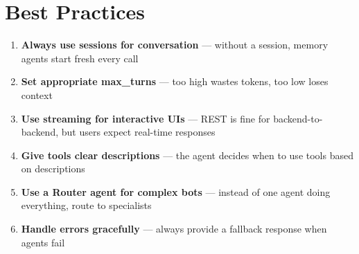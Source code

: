 \section{Best Practices}

\begin{enumerate}
    \item \textbf{Always use sessions for conversation} --- without a session, memory agents start fresh every call
    \item \textbf{Set appropriate max\_turns} --- too high wastes tokens, too low loses context
    \item \textbf{Use streaming for interactive UIs} --- REST is fine for backend-to-backend, but users expect real-time responses
    \item \textbf{Give tools clear descriptions} --- the agent decides when to use tools based on descriptions
    \item \textbf{Use a Router agent for complex bots} --- instead of one agent doing everything, route to specialists
    \item \textbf{Handle errors gracefully} --- always provide a fallback response when agents fail
\end{enumerate}
